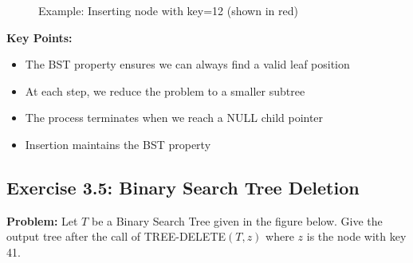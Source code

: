 \begin{figure}[H]
    \centering
    \caption*{\footnotesize Example: Inserting node with key=12 (shown in red)}
\end{figure}

\textbf{Key Points:}
\begin{itemize}
    \item The BST property ensures we can always find a valid leaf position
    \item At each step, we reduce the problem to a smaller subtree
    \item The process terminates when we reach a NULL child pointer
    \item Insertion maintains the BST property
\end{itemize}

\subsection{Exercise 3.5: Binary Search Tree Deletion}
\textbf{Problem:} Let $T$ be a Binary Search Tree given in the figure below. Give the output tree after the call of TREE-DELETE$(T, z)$ where $z$ is the node with key 41.

